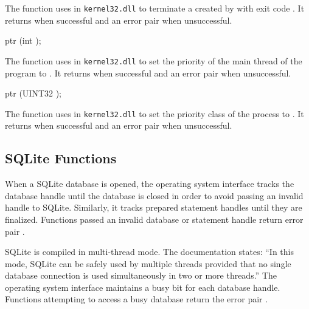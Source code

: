 The  function uses
 in \texttt{kernel32.dll} to terminate a
 created by  with exit
code . It returns  when successful and an
error pair when unsuccessful.

\begin{function}
  ptr (int );
\end{function}\antipar

The  function uses
 in \texttt{kernel32.dll} to set the
priority of the main thread of the program to . It
returns  when successful and an error pair when
unsuccessful.

\begin{function}
  ptr (UINT32 );
\end{function}\antipar

The  function uses
 in \texttt{kernel32.dll} to set the priority
class of the process to . It returns
 when successful and an error pair when unsuccessful.

\subsection {SQLite Functions}

When a SQLite database is opened, the operating system interface
tracks the database handle until the database is closed in order to
avoid passing an invalid handle to SQLite. Similarly, it tracks
prepared statement handles until they are finalized.  Functions passed
an invalid database or statement handle return error pair
.

SQLite is compiled in multi-thread mode. The documentation states:
``In this mode, SQLite can be safely used by multiple threads provided
that no single database connection is used simultaneously in two or
more threads.''   \mitigation The operating system interface
maintains a busy bit for each database handle. Functions attempting to
access a busy database return the error pair
.

